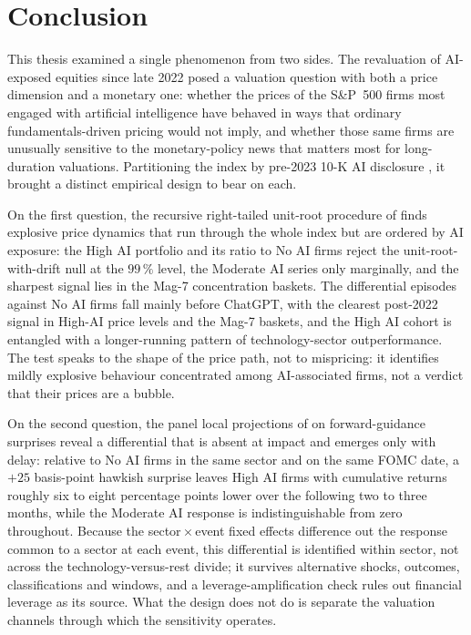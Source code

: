 \chapter{Conclusion}
\label{ch:conclusion}

This thesis examined a single phenomenon from two sides. The
revaluation of AI-exposed equities since late 2022 posed a valuation
question with both a price dimension and a monetary one: whether the
prices of the S\&P~500 firms most engaged with artificial intelligence
have behaved in ways that ordinary fundamentals-driven pricing would
not imply, and whether those same firms are unusually sensitive to the
monetary-policy news that matters most for long-duration valuations.
Partitioning the index by pre-2023 10-K AI disclosure
\citep{anteSaggu2025}, it brought a distinct empirical design to bear
on each.

On the first question, the recursive right-tailed unit-root procedure
of \citet{phillipsShiYu2015a} finds explosive price dynamics that run
through the whole index but are ordered by AI exposure: the High AI
portfolio and its ratio to No AI firms reject the unit-root-with-drift
null at the $99\,\%$ level, the Moderate AI series only marginally, and
the sharpest signal lies in the Mag-7 concentration baskets. The
differential episodes against No AI firms fall mainly before ChatGPT,
with the clearest post-2022 signal in High-AI price levels and the
Mag-7 baskets, and the High AI cohort is entangled with a
longer-running pattern of technology-sector outperformance. The test
speaks to the shape of the price path, not to mispricing: it
identifies mildly explosive behaviour concentrated among AI-associated
firms, not a verdict that their prices are a bubble.

On the second question, the panel local projections of
\citet{jorda2005} on \citet{swanson2021} forward-guidance surprises
reveal a differential that is absent at impact and emerges only with
delay: relative to No AI firms in the same sector and on the same FOMC
date, a $+25$ basis-point hawkish surprise leaves High AI firms with
cumulative returns roughly six to eight percentage points lower over
the following two to three months, while the Moderate AI response is
indistinguishable from zero throughout. Because the
sector\,$\times$\,event fixed effects difference out the response
common to a sector at each event, this differential is identified
within sector, not across the technology-versus-rest divide; it
survives alternative shocks, outcomes, classifications and windows,
and a leverage-amplification check rules out financial leverage as its
source. What the design does not do is separate the valuation channels
through which the sensitivity operates.

